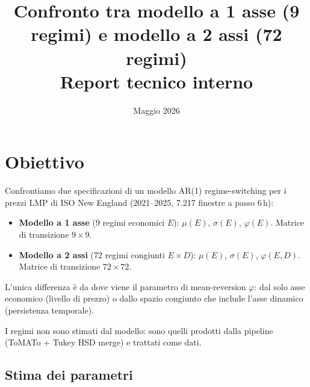 \documentclass[12pt]{article}
\title{Confronto tra modello a 1 asse (9 regimi) e modello a 2 assi (72 regimi)\\[0.5em]
\large Report tecnico interno}
\author{}
\date{Maggio 2026}
\begin{document}
\maketitle

\section{Obiettivo}

Confrontiamo due specificazioni di un modello AR(1) regime-switching per i prezzi LMP di ISO New England (2021--2025, 7.217 finestre a passo 6\,h):
\begin{itemize}[nosep]
\item \textbf{Modello a 1 asse} (9 regimi economici $E$): $\mu(E)$, $\sigma(E)$, $\varphi(E)$. Matrice di transizione $9 \times 9$.
\item \textbf{Modello a 2 assi} (72 regimi congiunti $E \times D$): $\mu(E)$, $\sigma(E)$, $\varphi(E,D)$. Matrice di transizione $72 \times 72$.
\end{itemize}
L'unica differenza è da dove viene il parametro di mean-reversion $\varphi$: dal solo asse economico (livello di prezzo) o dallo spazio congiunto che include l'asse dinamico (persistenza temporale).

I regimi non sono stimati dal modello: sono quelli prodotti dalla pipeline (ToMATo + Tukey HSD merge) e trattati come dati.

\subsection{Stima dei parametri}
\end{document}
